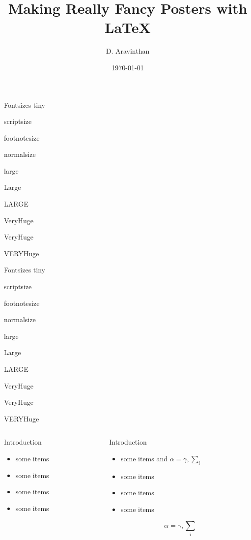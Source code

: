 \documentclass[final,hyperref={pdfpagelabels=false}]{beamer}
\title[Fancy Posters]{Making Really Fancy Posters with \LaTeX}
\author[D. Aravinthan]{D. Aravinthan}
\institute[Central University of Tamilnadu]{Central University of Tamilnadu, Thiruvarur}
\date{\today}
\begin{document}
  \begin{frame}{} 
    \vfill
    \begin{block}{\large Fontsizes}
      \centering
      {\tiny tiny}\par
      {\scriptsize scriptsize}\par
      {\footnotesize footnotesize}\par
      {\normalsize normalsize}\par
      {\large large}\par
      {\Large Large}\par
      {\LARGE LARGE}\par
      {\veryHuge VeryHuge}\par
      {\VeryHuge VeryHuge}\par
      {\VERYHuge VERYHuge}\par
    \end{block}
    \vfill
    \vfill
    \begin{block}{\large Fontsizes}
      \centering
      {\tiny tiny}\par
      {\scriptsize scriptsize}\par
      {\footnotesize footnotesize}\par
      {\normalsize normalsize}\par
      {\large large}\par
      {\Large Large}\par
      {\LARGE LARGE}\par
      {\veryHuge VeryHuge}\par
      {\VeryHuge VeryHuge}\par
      {\VERYHuge VERYHuge}\par
    \end{block}
    \vfill
    \begin{columns}[t]
      \begin{column}{.48\linewidth}
        \begin{block}{Introduction}
          \begin{itemize}
          \item some items
          \item some items
          \item some items
          \item some items
          \end{itemize}
        \end{block}
      \end{column}
      \begin{column}{.48\linewidth}
        \begin{block}{Introduction}
          \begin{itemize}
          \item some items and $\alpha=\gamma, \sum_{i}$
          \item some items
          \item some items
          \item some items
          \end{itemize}
          $$\alpha=\gamma, \sum_{i}$$
        \end{block}


\end{column}
\end{columns}
\end{frame}
\end{document}
